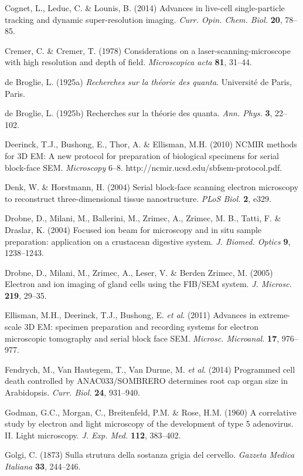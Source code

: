 \documentclass{article}
\begin{document}
\begin{hangpars}
Cognet, L., Leduc, C. \& Lounis, B. (2014) Advances in live-cell single-particle tracking and dynamic super-resolution imaging. \textit{Curr. Opin. Chem. Biol.} \textbf{20}, 78–85.

Cremer, C. \& Cremer, T. (1978) Considerations on a laser-scanning-microscope with high resolution and depth of field. \textit{Microscopica acta} \textbf{81}, 31–44.

de Broglie, L. (1925a) \textit{Recherches sur la théorie des quanta}. Université de Paris, Paris.

de Broglie, L. (1925b) Recherches sur la théorie des quanta. \textit{Ann. Phys.} \textbf{3}, 22–102.

Deerinck, T.J., Bushong, E., Thor, A. \& Ellisman, M.H. (2010) NCMIR methods for 3D EM: A new protocol for preparation of biological specimens for serial block-face SEM. \textit{Microscopy} 6–8. http://ncmir.ucsd.edu/sbfsem-protocol.pdf.

Denk, W. \& Horstmann, H. (2004) Serial block-face scanning electron microscopy to reconstruct three-dimensional tissue nanostructure. \textit{PLoS Biol.} \textbf{2}, e329.

Drobne, D., Milani, M., Ballerini, M., Zrimec, A., Zrimec, M. B., Tatti, F. \& Draslar, K. (2004) Focused ion beam for microscopy and in situ sample preparation: application on a crustacean digestive system. \textit{J. Biomed. Optics} \textbf{9}, 1238–1243.

Drobne, D., Milani, M., Zrimec, A., Leser, V. \& Berden Zrimec, M. (2005) Electron and ion imaging of gland cells using the FIB/SEM system. \textit{J. Microsc.} \textbf{219}, 29–35.

Ellisman, M.H., Deerinck, T.J., Bushong, E. \textit{et al}. (2011) Advances in extreme-scale 3D EM: specimen preparation and recording systems for electron microscopic tomography and serial block face SEM. \textit{Microsc. Microanal.} \textbf{17}, 976–977.

Fendrych, M., Van Hautegem, T., Van Durme, M. \textit{et al}. (2014) Programmed cell death controlled by ANAC033/SOMBRERO determines root cap organ size in Arabidopsis. \textit{Curr. Biol.} \textbf{24}, 931–940.

Godman, G.C., Morgan, C., Breitenfeld, P.M. \& Rose, H.M. (1960) A correlative study by electron and light microscopy of the development of type 5 adenovirus. II. Light microscopy. \textit{J. Exp. Med.} \textbf{112}, 383–402.

Golgi, C. (1873) Sulla strutura della sostanza grigia del cervello. \textit{Gazzeta Medica Italiana} \textbf{33}, 244–246.


\end{hangpars}
\end{document}
